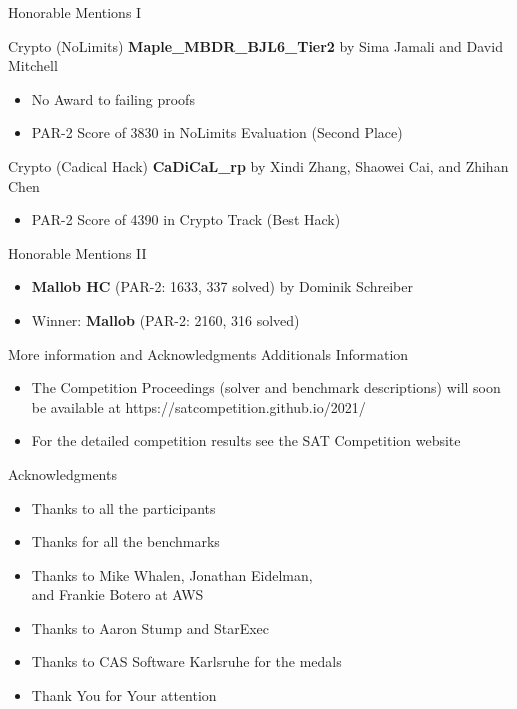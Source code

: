 \documentclass[trans]{beamer}
\begin{document}
\begin{frame}{Honorable Mentions I}

\begin{block}{Crypto (NoLimits)}
\textbf{Maple\_MBDR\_BJL6\_Tier2} by Sima Jamali and David Mitchell
\begin{itemize}
\item No Award to failing proofs
\item PAR-2 Score of 3830 in NoLimits Evaluation (Second Place)
\end{itemize}
\end{block}

\begin{block}{Crypto (Cadical Hack)}
\textbf{CaDiCaL\_rp} by Xindi Zhang, Shaowei Cai, and Zhihan Chen
\begin{itemize}
\item PAR-2 Score of 4390 in Crypto Track (Best Hack)
\end{itemize}
\end{block}

\end{frame}


\begin{frame}{Honorable Mentions II}
\begin{itemize}
\item {\bf Mallob HC} (PAR-2: 1633, 337 solved) by Dominik Schreiber
\item Winner: {\bf Mallob} (PAR-2: 2160, 316 solved)
\end{itemize}
\centering
{}
\end{frame}


\begin{frame}{More information and Acknowledgments}
Additionals Information
\begin{itemize}
	\item The Competition Proceedings (solver and benchmark descriptions)
	 will soon be available at https://satcompetition.github.io/2021/
	\item For the detailed competition results see the SAT Competition website
\end{itemize}
\medskip

Acknowledgments
\begin{itemize}
\item Thanks to all the participants
\item Thanks for all the benchmarks
\item Thanks to Mike Whalen, Jonathan Eidelman,\\and Frankie Botero at AWS
\item Thanks to Aaron Stump and StarExec
\item Thanks to CAS Software Karlsruhe for the medals
\end{itemize}
\begin{itemize}
\item Thank You for Your attention
\end{itemize}
\end{frame}


\end{document}
